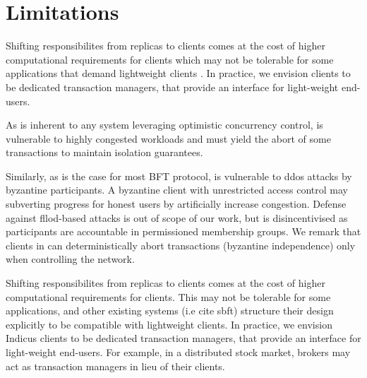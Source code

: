 \section{Limitations}
Shifting responsibilites from replicas to clients comes at the cost of higher computational requirements for clients which may not be tolerable for some applications that demand lightweight clients \cite{gueta2018sbft}. In practice, we envision \sys clients to be dedicated transaction managers, that provide an interface for light-weight end-users. 

As is inherent to any system leveraging optimistic concurrency control, \sys is vulnerable to highly congested workloads and must yield the abort of some transactions to maintain isolation guarantees. %

Similarly, as is the case for most BFT protocol, \sys is vulnerable to ddos attacks by byzantine participants. A byzantine client with unrestricted access control may subverting progress for honest users by artificially increase congestion. Defense against fllod-based attacks is out of scope of our work, but is disincentivised as participants are accountable in permissioned membership groups. We remark that clients in \sys can deterministically abort transactions (byzantine independence) only when controlling the network.



\iffalse

Shifting responsibilites from replicas to clients comes at the cost of higher computational requirements for clients. This may not be tolerable for some applications, and other existing systems (i.e cite sbft) structure their design explicitly to be compatible with lightweight clients. In practice, we envision Indicus clients to be dedicated transaction managers, that provide an interface for light-weight end-users. For example, in a distributed stock market, brokers may act as transaction managers in lieu of their clients.

